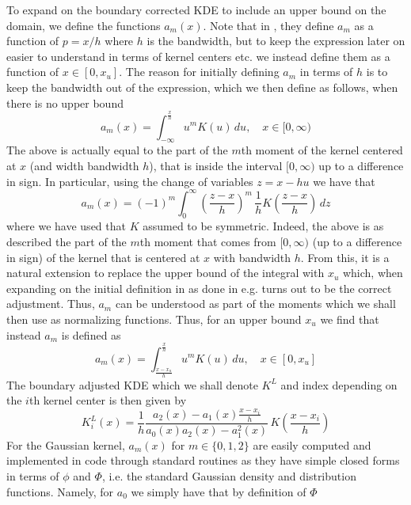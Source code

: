 \documentclass[../Thesis.tex]{subfiles}
\begin{document}
To expand on the boundary corrected KDE to include an upper bound on the domain, we define the functions $a_m\left(x\right)$. Note that in \cite{Jones1993SimpleBC}, they define $a_m$ as a function of $p = x / h$ where $h$ is the bandwidth, but to keep the expression later on easier to understand in terms of kernel centers etc. we instead define them as a function of $x \in [0,x_u]$. The reason for initially defining $a_m$ in terms of $h$ is to keep the bandwidth out of the expression, which we then define as follows, when there is no upper bound
$$a_m\left(x\right) = \int_{-\infty}^{\frac{x}{h}} u^m K\left(u\right) \, du, \quad x\in [0,\infty)$$
The above is actually equal to the part of the $m$th moment of the kernel centered at $x$ (and width bandwidth $h$), that is inside the interval $[0,\infty)$ up to a difference in sign. In particular, using the change of variables $z=x-hu$ we have that
$$a_m\left(x\right) = \left(-1\right)^m  \int_{0}^{\infty} \left(\frac{z-x}{h}\right)^m \, \frac{1}{h}K\left(\frac{z-x}{h}\right) \, dz$$
where we have used that $K$ assumed to be symmetric. Indeed, the above is as described the part of the $m$th moment that comes from $[0,\infty)$ (up to a difference in sign) of the kernel that is centered at $x$ with bandwidth $h$. From this, it is a natural extension to replace the upper bound of the integral with $x_u$ which, when expanding on the initial definition in \cite{Jones1993SimpleBC} as done in e.g.
\cite{Simple_and_eff_boundary_correction_for_kern_densities}
turns out to be the correct adjustment. Thus, $a_m$ can be understood as part of the moments which we shall then use as normalizing functions. Thus, for an upper bound $x_u$ we find that instead $a_m$ is defined as
$$a_m\left(x\right) = \int_{\frac{x-x_u}{h}}^{\frac{x}{h}} u^m K\left(u\right)\, du, \quad x\in [0,x_u]$$
The boundary adjusted KDE which we shall denote $K^L$ and index depending on the $i$th kernel center is then given by
\begin{equation}\label{eq:jones bc corrected kernel}
    K_i^{L} \left(x\right) = \frac{1}{h}\frac{a_2\left(x\right) - a_1\left(x\right) \frac{x - x_i}{h}}{a_0 \left(x\right) a_2\left(x\right) - a_1^2 \left(x\right) } \, K\left(\frac{x - x_i}{h}\right)
\end{equation}
For the Gaussian kernel, $a_m\left(x\right)$ for $m \in \{0,1,2\}$ are easily computed and implemented in code through standard routines as they have simple closed forms in terms of $\phi$ and $\Phi$, i.e. the standard Gaussian density and distribution functions. Namely, for $a_0$ we simply have that by definition of $\Phi$
\end{document}
